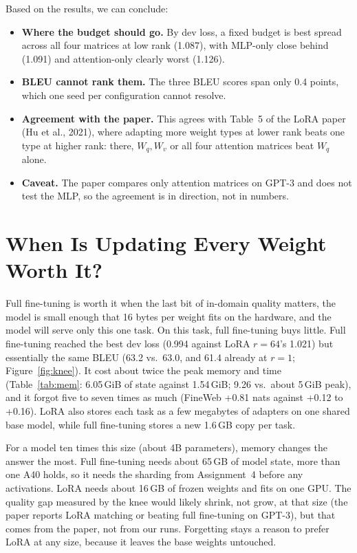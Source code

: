 \documentclass[10pt]{article}
\begin{document}
Based on the results, we can conclude:
\begin{itemize}
\item \textbf{Where the budget should go.} By dev loss, a fixed budget
  is best spread across all four matrices at low rank (1.087), with
  MLP-only close behind (1.091) and attention-only clearly worst
  (1.126).
\item \textbf{BLEU cannot rank them.} The three BLEU scores span only
  0.4 points, which one seed per configuration cannot resolve.
\item \textbf{Agreement with the paper.} This agrees with Table~5 of
  the LoRA paper (Hu et al., 2021), where adapting more weight types at
  lower rank beats one type at higher rank: there, $W_q, W_v$ or all
  four attention matrices beat $W_q$ alone.
\item \textbf{Caveat.} The paper compares only attention matrices on
  GPT-3 and does not test the MLP, so the agreement is in direction,
  not in numbers.
\end{itemize}

\section*{When Is Updating Every Weight Worth It?}

Full fine-tuning is worth it when the last bit of in-domain quality
matters, the model is small enough that 16 bytes per weight fits on the
hardware, and the model will serve only this one task. On this task,
full fine-tuning buys little. Full fine-tuning reached the best dev loss
(0.994 against LoRA $r=64$'s 1.021) but essentially the same BLEU
(63.2 vs.\ 63.0, and 61.4 already at $r=1$; Figure~\ref{fig:knee}). It
cost about twice the peak memory and time (Table~\ref{tab:mem}:
6.05\,GiB of state against 1.54\,GiB; 9.26 vs.\ about 5\,GiB peak), and
it forgot five to seven times as much (FineWeb +0.81 nats against
+0.12 to +0.16). LoRA also stores each task as a few megabytes of
adapters on one shared base model, while full fine-tuning stores a new
1.6\,GB copy per task.

For a model ten times this size (about 4B parameters), memory changes
the answer the most. Full fine-tuning needs about 65\,GB of model state,
more than one A40 holds, so it needs the sharding from Assignment~4
before any activations. LoRA needs about 16\,GB of frozen weights and
fits on one GPU. The quality gap measured by the knee would likely
shrink, not grow, at that size (the paper reports LoRA matching or
beating full fine-tuning on GPT-3), but that comes from the paper, not
from our runs. Forgetting stays a reason to prefer LoRA at any size,
because it leaves the base weights untouched.
\end{document}
